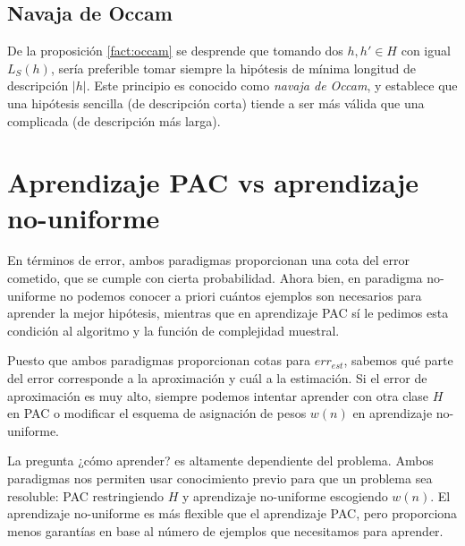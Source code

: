 \subsection{Navaja de Occam}
De la proposición \ref{fact:occam} se desprende que tomando dos $h, h' \in H$ con igual $L_S(h)$, sería preferible tomar siempre
la hipótesis de mínima longitud de descripción $|h|$. Este principio es conocido como \textit{navaja de Occam}, y establece
que una hipótesis sencilla (de descripción corta) tiende a ser más válida que una complicada (de descripción más larga).

\section{Aprendizaje PAC vs aprendizaje no-uniforme}
En términos de error, ambos paradigmas proporcionan una cota del error cometido, que se cumple con cierta probabilidad. Ahora
bien, en paradigma no-uniforme no podemos conocer a priori cuántos ejemplos son necesarios para aprender la mejor hipótesis,
mientras que en aprendizaje PAC sí le pedimos esta condición al algoritmo y la función de complejidad muestral.

Puesto que ambos paradigmas proporcionan cotas para $err_{est}$, sabemos qué parte del error corresponde a la aproximación
y cuál a la estimación. Si el error de aproximación es muy alto, siempre podemos intentar aprender con otra clase $H$ en PAC
o modificar el esquema de asignación de pesos $w(n)$ en aprendizaje no-uniforme.

La pregunta ¿cómo aprender? es altamente dependiente del problema. Ambos paradigmas nos permiten usar conocimiento
previo para que un problema sea resoluble: PAC restringiendo $H$ y aprendizaje no-uniforme escogiendo $w(n)$. El aprendizaje
no-uniforme es más flexible que el aprendizaje PAC, pero proporciona menos garantías en base al número de ejemplos que necesitamos
para aprender.